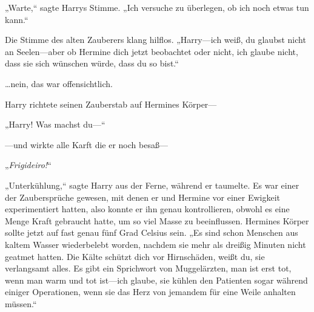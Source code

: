 „Warte,“ sagte Harrys Stimme. „Ich versuche zu überlegen, ob ich noch etwas tun kann.“

Die Stimme des alten Zauberers klang hilflos. „Harry—ich weiß, du glaubst nicht an Seelen—aber ob Hermine dich jetzt beobachtet oder nicht, ich glaube nicht, dass sie sich wünschen würde, dass du so bist.“

…nein, das war offensichtlich.

Harry richtete seinen Zauberstab auf Hermines Körper—

„Harry! Was machst du—“

—und wirkte alle Karft die er noch besaß—

„\emph{Frigideiro!}“


„Unterkühlung,“ sagte Harry aus der Ferne, während er taumelte. Es war einer der Zaubersprüche gewesen, mit denen er und Hermine vor einer Ewigkeit experimentiert hatten, also konnte er ihn genau kontrollieren, obwohl es eine Menge Kraft gebraucht hatte, um so viel Masse zu beeinflussen. Hermines Körper sollte jetzt auf fast genau fünf Grad Celsius sein. „Es sind schon Menschen aus kaltem Wasser wiederbelebt worden, nachdem sie mehr als dreißig Minuten nicht geatmet hatten. Die Kälte schützt dich vor Hirnschäden, weißt du, sie verlangsamt alles. Es gibt ein Sprichwort von Muggelärzten, man ist erst tot, wenn man warm und tot ist—ich glaube, sie kühlen den Patienten sogar während einiger Operationen, wenn sie das Herz von jemandem für eine Weile anhalten müssen.“

